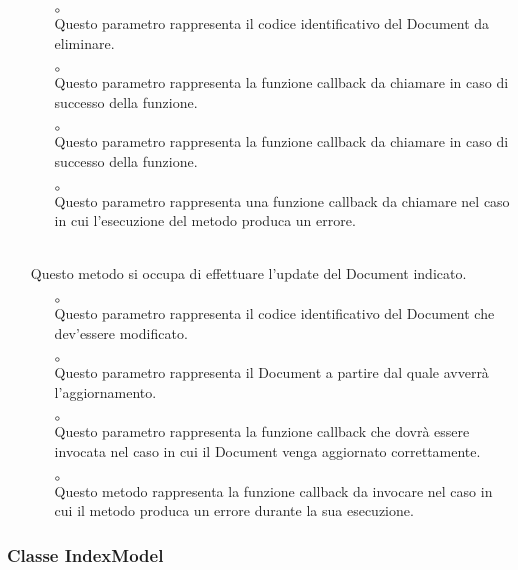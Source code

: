 \begin{itemize}
\begin{itemize}
\item[$\circ$]  \\ Questo parametro rappresenta il codice identificativo del Document da eliminare.
\item[$\circ$]  \\ Questo parametro rappresenta la funzione callback da chiamare in caso di successo della funzione.
\item[$\circ$]  \\ Questo parametro rappresenta la funzione callback da chiamare in caso di successo della funzione.
\item[$\circ$]  \\ Questo parametro rappresenta una funzione callback da chiamare nel caso in cui l'esecuzione del metodo produca un errore.
\end{itemize}
\item[]  \\ Questo metodo si occupa di effettuare l'update del Document indicato.
\begin{itemize}\addtolength{\itemsep}{-0.5\baselineskip}
\item[$\circ$]  \\ Questo parametro rappresenta il codice identificativo del Document che dev'essere modificato.
\item[$\circ$]  \\ Questo parametro rappresenta il Document a partire dal quale avverrà l'aggiornamento.
\item[$\circ$]  \\ Questo parametro rappresenta la funzione callback che dovrà essere invocata nel caso in cui il Document venga aggiornato correttamente.
\item[$\circ$]  \\ Questo metodo rappresenta la funzione callback da invocare nel caso in cui il metodo produca un errore durante la sua esecuzione.
\end{itemize}
\end{itemize}

\subsubsection{Classe IndexModel}


